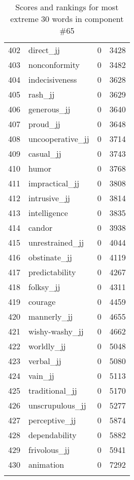 \begin{longtable}[!htbp]{| rlr@{.}l |}
    402 & direct\_jj & 0 & 3428 \\
    403 & nonconformity & 0 & 3482 \\
    404 & indecisiveness & 0 & 3628 \\
    405 & rash\_jj & 0 & 3629 \\
    406 & generous\_jj & 0 & 3640 \\
    407 & proud\_jj & 0 & 3648 \\
    408 & uncooperative\_jj & 0 & 3714 \\
    409 & casual\_jj & 0 & 3743 \\
    410 & humor & 0 & 3768 \\
    411 & impractical\_jj & 0 & 3808 \\
    412 & intrusive\_jj & 0 & 3814 \\
    413 & intelligence & 0 & 3835 \\
    414 & candor & 0 & 3938 \\
    415 & unrestrained\_jj & 0 & 4044 \\
    416 & obstinate\_jj & 0 & 4119 \\
    417 & predictability & 0 & 4267 \\
    418 & folksy\_jj & 0 & 4311 \\
    419 & courage & 0 & 4459 \\
    420 & mannerly\_jj & 0 & 4655 \\
    421 & wishy-washy\_jj & 0 & 4662 \\
    422 & worldly\_jj & 0 & 5048 \\
    423 & verbal\_jj & 0 & 5080 \\
    424 & vain\_jj & 0 & 5113 \\
    425 & traditional\_jj & 0 & 5170 \\
    426 & unscrupulous\_jj & 0 & 5277 \\
    427 & perceptive\_jj & 0 & 5874 \\
    428 & dependability & 0 & 5882 \\
    429 & frivolous\_jj & 0 & 5941 \\
    430 & animation & 0 & 7292 \\
    \hline
    \caption{Scores and rankings for most extreme 30 words in component \#65} \\
\end{longtable}
